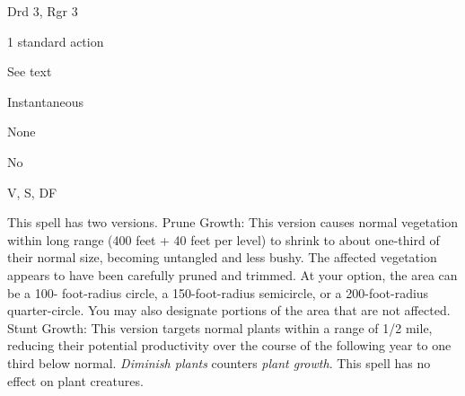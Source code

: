 
\begin{description*}
\item[Level:] Drd 3, Rgr 3
\item[Casting Time:] 1 standard action
\item[Range:] See text
\item[Duration:] Instantaneous
\item[Saving Throw:] None
\item[Spell Resistance:] No
\item[Components:] V, S, DF
\end{description*}

This spell has two versions.
Prune Growth: This version causes normal vegetation within long range
(400 feet + 40 feet per level) to shrink to about one-third of their normal size,
becoming untangled and less bushy. The affected vegetation appears to have been
carefully pruned and trimmed.
At your option, the area can be a 100- foot-radius circle, a 150-foot-radius semicircle,
or a 200-foot-radius quarter-circle.
You may also designate portions of the area that are not affected.
Stunt Growth: This version targets normal plants within a range of 1/2
mile, reducing their potential productivity over the course of the following year
to one third below normal.
\textit{Diminish plants} counters \textit{plant growth}.
This spell has no effect on plant creatures.